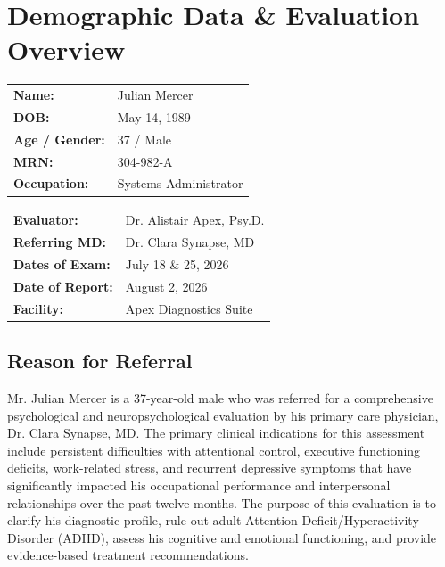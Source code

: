 \section{Demographic Data \& Evaluation Overview}

\noindent
\begin{minipage}[t]{0.49\textwidth}
    \begin{tcolorbox}[psychbox, title=Patient Demographics]
        \begin{tabular}{ll}
            \textbf{Name:} & Julian Mercer \\
            \textbf{DOB:} & May 14, 1989 \\
            \textbf{Age / Gender:} & 37 / Male \\
            \textbf{MRN:} & 304-982-A \\
            \textbf{Occupation:} & Systems Administrator
        \end{tabular}
    \end{tcolorbox}
\end{minipage}%
\hfill
\begin{minipage}[t]{0.49\textwidth}
    \begin{tcolorbox}[psychbox, title=Evaluation Details]
        \begin{tabular}{ll}
            \textbf{Evaluator:} & Dr. Alistair Apex, Psy.D. \\
            \textbf{Referring MD:} & Dr. Clara Synapse, MD \\
            \textbf{Dates of Exam:} & July 18 \& 25, 2026 \\
            \textbf{Date of Report:} & August 2, 2026 \\
            \textbf{Facility:} & Apex Diagnostics Suite
        \end{tabular}
    \end{tcolorbox}
\end{minipage}

\vspace{0.4cm}

\subsection{Reason for Referral}
Mr. Julian Mercer is a 37-year-old male who was referred for a comprehensive psychological and neuropsychological evaluation by his primary care physician, Dr. Clara Synapse, MD. The primary clinical indications for this assessment include persistent difficulties with attentional control, executive functioning deficits, work-related stress, and recurrent depressive symptoms that have significantly impacted his occupational performance and interpersonal relationships over the past twelve months. The purpose of this evaluation is to clarify his diagnostic profile, rule out adult Attention-Deficit/Hyperactivity Disorder (ADHD), assess his cognitive and emotional functioning, and provide evidence-based treatment recommendations.


